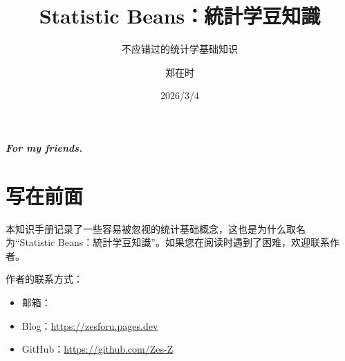 \documentclass[lang=cn,10pt]{elegantbook}
\title{Statistic Beans：統計学豆知識}
\subtitle{不应错过的统计学基础知识}
\author{郑在时}
\date{ 2026/3/4}
\begin{document}
\maketitle

\frontmatter


\newpage
\thispagestyle{empty}
\vspace*{\fill}
\begin{center}
    \large \textbf{\textit{For my friends.}}
\end{center}
\vfill  


\tableofcontents
\mainmatter



\chapter{写在前面}

本知识手册记录了一些容易被忽视的统计基础概念，这也是为什么取名为“Statistic Beans：統計学豆知識”。如果您在阅读时遇到了困难，欢迎联系作者。

作者的联系方式：
\begin{itemize}
  \item 邮箱：
  \item Blog：\href{https://zesforu.pages.dev}{https://zesforu.pages.dev}
  \item GitHub：\href{https://github.com/Zes-Z}{https://github.com/Zes-Z}
\end{itemize}
\end{document}
